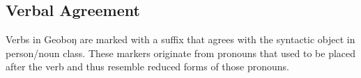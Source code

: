 \documentclass[a4paper,11pt,oneside,openany]{memoir}
\begin{document}
\subsection{Verbal Agreement}

Verbs in Geoboŋ are marked with a suffix that agrees with the syntactic object in person/noun class. These markers originate from pronouns that used to be placed after the verb and thus resemble reduced forms of those pronouns. 

\end{document}
